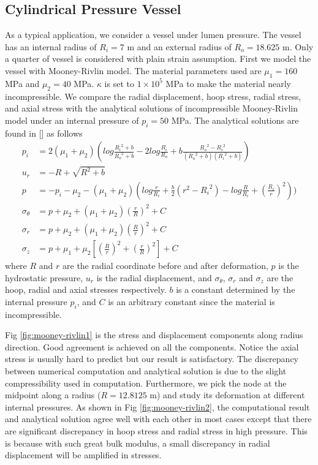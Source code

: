 \subsection{Cylindrical Pressure Vessel}
\label{pressure_vessel}
As a typical application, we consider a vessel under lumen pressure. The vessel has an internal radius of $R_i = 7$ m and an external radius of $R_o = 18.625$ m. Only a quarter of vessel is considered with plain strain assumption. First we model the vessel with Mooney-Rivlin model. The material parameters used are $\mu_1 = 160$ MPa and $\mu_2 = 40$ MPa. $\kappa$ is set to $1 \times 10^5$ MPa to make the material nearly incompressible. We compare the radial displacement, hoop stress, radial stress, and axial stress with the analytical solutions of incompressible Mooney-Rivlin model under an internal pressure of $p_i = 50$ MPa. The analytical solutions are found in [] as follows 
\begin{subequations}
\begin{align}
p_i &= 2(\mu_1 + \mu_2)(log\frac{{R_i}^2 + b}{{R_o}^2 + b} - 2log\frac{R_i}{R_o} +
b\frac{{R_o}^2 - {R_i}^2}{({R_o}^2+b)({R_i}^2+b)}) \\
u_r &= -R + \sqrt{R^2 + b} \\
p &= - p_i - \mu_2 - (\mu_1 + \mu_2)(log\frac{r}{R_i} + \frac{b}{2}(r^2 - {R_i}^2) - log\frac{R}{R_i} + {(\frac{R_i}{r})}^2) ) \\
\sigma_{\theta} &= p + \mu_2 + (\mu_1 + \mu_2)(\frac{r}{R})^2 + C \\
\sigma_r &= p + \mu_2 + (\mu_1 + \mu_2)(\frac{R}{r})^2 + C \\
\sigma_z &= p +  \mu_1 + \mu_2[(\frac{R}{r})^2 + (\frac{r}{R})^2] + C
\end{align}
\end{subequations}
where $R$ and $r$ are the radial coordinate before and after deformation, $p$ is the hydrostatic pressure, $u_r$ is the radial displacement, and $\sigma_{\theta}$, $\sigma_r$ and $\sigma_z$ are the hoop, radial and axial stresses respectively. $b$ is a constant determined by the internal pressure $p_i$, and $C$ is an arbitrary constant since the material is incompressible. 

Fig \ref{fig:mooney-rivlin1} is the stress and displacement components along radius direction. Good agreement is achieved on all the components. Notice the axial stress is usually hard to predict but our result is satisfactory. The discrepancy between numerical computation and analytical solution is due to the slight compressibility used in computation. Furthermore, we pick the node at the midpoint along a radius ($R = 12.8125$ m) and study its deformation at different internal pressures. As shown in Fig \ref{fig:mooney-rivlin2}, the computational result and analytical solution agree well with each other in most cases except that there are significant discrepancy in hoop stress and radial stress in high pressure. This is because with such great bulk modulus, a small discrepancy in radial displacement will be amplified in stresses. 

